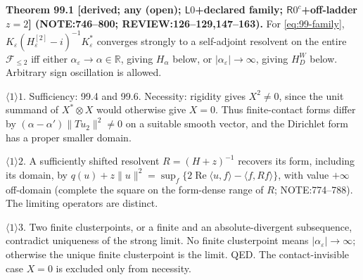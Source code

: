 \textbf{Theorem 99.1 [derived; any (open); \(\mathsf L0\)+declared family; \(\mathsf R0^c\)+off-ladder \(z=2\)]
(NOTE:746--800; REVIEW:126--129,147--163).}
For \eqref{eq:99-family}, \(K_\varepsilon(H_\varepsilon^{[2]}-i)^{-1}K_\varepsilon^*\) converges strongly to a
self-adjoint resolvent on the entire \(\mathcal F_{\le2}\) iff either \(\alpha_\varepsilon\to\alpha\in\mathbb R\),
giving \(H_\alpha\) below, or \(|\alpha_\varepsilon|\to\infty\), giving \(H_D^W\) below. Arbitrary sign oscillation is allowed.
\par\(\langle1\rangle1\). Sufficiency: 99.4 and 99.6. Necessity: rigidity gives \(X^2\ne0\), since the unit summand of
\(X^*\otimes X\) would otherwise give \(X=0\). Thus finite-contact forms differ by
\((\alpha-\alpha')\|Tu_2\|^2\ne0\) on a suitable smooth vector, and the Dirichlet form has a proper smaller domain.
\par\(\langle1\rangle2\). A sufficiently shifted resolvent \(R=(H+z)^{-1}\) recovers its form, including its domain, by
\(q(u)+z\|u\|^2=\sup_f\{2\operatorname{Re}\langle u,f\rangle-\langle f,Rf\rangle\}\), with value \(+\infty\) off-domain
(complete the square on the form-dense range of \(R\); NOTE:774--788). The limiting operators are distinct.
\par\(\langle1\rangle3\). Two finite clusterpoints, or a finite and an absolute-divergent subsequence, contradict uniqueness
of the strong limit. No finite clusterpoint means \(|\alpha_\varepsilon|\to\infty\); otherwise the unique finite clusterpoint
is the limit. QED. The contact-invisible case \(X=0\) is excluded only from necessity.

